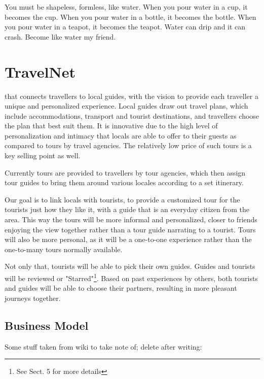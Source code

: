 \begin{savequote}[75mm] 
You must be shapeless, formless, like water. When you pour water in a cup, it becomes the cup. When you pour water in a bottle, it becomes the bottle. When you pour water in a teapot, it becomes the teapot. Water can drip and it can crash. Become like water my friend.
\end{savequote}

\chapter{TravelNet}

 that connects travellers to local guides, with the vision to provide each traveller a unique and personalized experience. Local guides draw out travel plans, which include accommodations, transport and tourist destinations, and travellers choose the plan that best suit them. It is innovative due to the high level of personalization and intimacy that locals are able to offer to their guests as compared to tours by travel agencies. The relatively low price of such tours is a key selling point as well.


Currently tours are provided to travellers by tour agencies, which then assign tour guides to bring them around various locales according to a set itinerary. 

Our goal is to link locals with tourists, to provide a customized tour for the tourists just how they like it, with a guide that is an everyday citizen from the area. This way the tours will be more informal and personalized, closer to friends enjoying the view together rather than a tour guide narrating to a tourist. Tours will also be more personal, as it will be a one-to-one experience rather than the one-to-many tours normally available.

Not only that, tourists will be able to pick their own guides. Guides and tourists will be reviewed or "Starred"\footnote {See Sect. 5 for more details}. Based on past experiences by others, both tourists and guides will be able to choose their partners, resulting in more pleasant journeys together.


\section{Business Model}

Some stuff taken from wiki to take note of; delete after writing:

